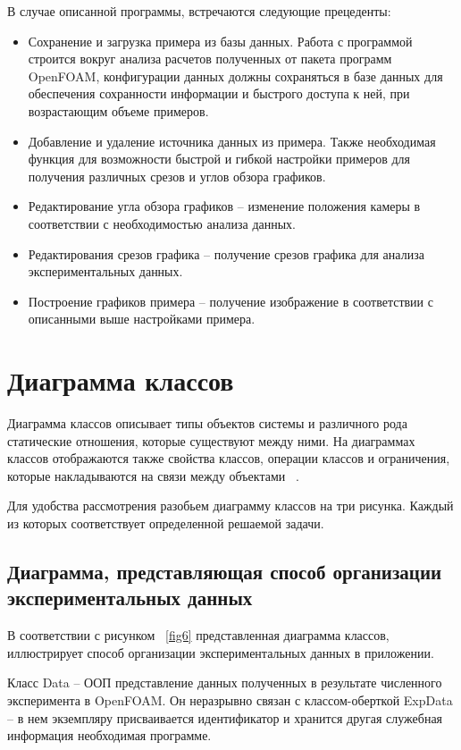 \documentclass[14pt]{extreport}
\begin{document}
В случае описанной программы, встречаются следующие прецеденты:
\begin{itemize}
	\item Сохранение и загрузка примера из базы данных. Работа с программой строится вокруг анализа расчетов полученных от пакета программ OpenFOAM, конфигурации данных должны сохраняться в базе данных для обеспечения сохранности информации и быстрого доступа к ней, при возрастающим объеме примеров. 
	\item Добавление и удаление источника данных из примера. Также необходимая функция для возможности быстрой и гибкой настройки примеров для получения различных срезов и углов обзора графиков.
	\item Редактирование угла обзора графиков -- изменение положения камеры в соответствии с необходимостью анализа данных.
	\item Редактирования срезов графика -- получение срезов графика для анализа экспериментальных данных.
	\item Построение графиков примера -- получение изображение в соответствии с описанными выше настройками примера.
\end{itemize}

\section{Диаграмма классов}
Диаграмма классов описывает типы объектов системы и различного рода статические отношения, которые существуют между ними. На диаграммах классов отображаются также свойства классов, операции классов и ограничения, которые накладываются на связи между объектами ~\cite{umlDistilled}.

Для удобства рассмотрения разобьем диаграмму классов на три рисунка. Каждый из которых соответствует определенной решаемой задачи. 

\subsection{Диаграмма, представляющая способ организации экспериментальных данных}

В соответствии с рисунком ~\ref{fig6} представленная диаграмма классов, иллюстрирует способ организации экспериментальных данных в приложении. 

Класс Data -- ООП представление данных полученных в результате численного эксперимента в OpenFOAM. Он неразрывно связан с классом-оберткой ExpData -- в нем экземпляру присваивается идентификатор и хранится другая служебная информация необходимая программе. 
\end{document}
